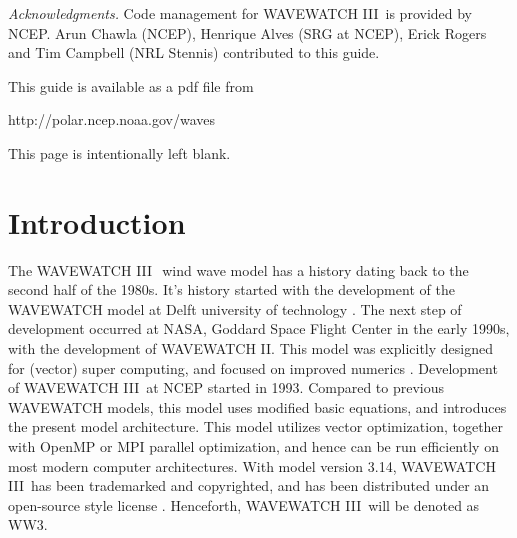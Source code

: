 \documentclass[12pt]{article}
\newcommand{\pstyle}{myheadings}
\newcommand{\wwt}{WAVEWATCH III$\:$\textsuperscript\textregistered}
\newcommand{\ww}{WAVEWATCH III}
\newcommand{\ws}{WW3}
\newcommand{\pb}{\strut \vfill \pagebreak}
\newcommand{\bpagea}{\strut

\vspace{2.5in} \centerline{This page is intentionally left blank.}}
\newcommand{\newsec}{\setcounter{equation}{0}
                      \setcounter{myfigno}{0}
                      \setcounter{mytabno}{0}}
\newcounter{myfigno}[section]
\newcounter{mytabno}[section]
\begin{document}
\vfill \pagebreak


{}

\noindent
{\it Acknowledgments.} Code management for \ww\ is provided by NCEP. Arun
Chawla (NCEP), Henrique Alves (SRG at NCEP), Erick Rogers and Tim Campbell
(NRL Stennis) contributed to this guide.

\vspace{\baselineskip} \noindent
This guide is available as a pdf file from

\vspace{\baselineskip}
\centerline{http://polar.ncep.noaa.gov/waves}


\vfill \pagebreak
{}

\tableofcontents

\pb
\pagestyle{empty}

\bpagea


\pb
\pagestyle{\pstyle}
\section{Introduction} \label{sec:intro}
\newsec

\noindent
The \wwt\ wind wave model has a history dating back to the second half of the
1980s. It's history started with the development of the WAVEWATCH model at
Delft university of technology \citep{tol:CHGE89, tol:CHGE90, tol:JPO91b}. The
next step of development occurred at NASA, Goddard Space Flight Center in the
early 1990s, with the development of WAVEWATCH II. This model was explicitly
designed for (vector) super computing, and focused on improved numerics
\citep{tol:JPO92, tol:ICCE92}. Development of \ww\ at NCEP started in 1993.
Compared to previous WAVEWATCH models, this model uses modified basic
equations, and introduces the present model architecture. This model utilizes
vector optimization, together with OpenMP or MPI parallel optimization, and
hence can be run efficiently on most modern computer architectures.  With
model version 3.14, \ww\ has been trademarked and copyrighted, and has been
distributed under an open-source style license \citep[see section 1.2 of ][or
the web
site\footnote{~http://polar.ncep.noaa.gov/waves/wavewatch/license.shtml
}]{tol:MMAB09a}. Henceforth, \ww\ will be denoted as \ws.
\end{document}
